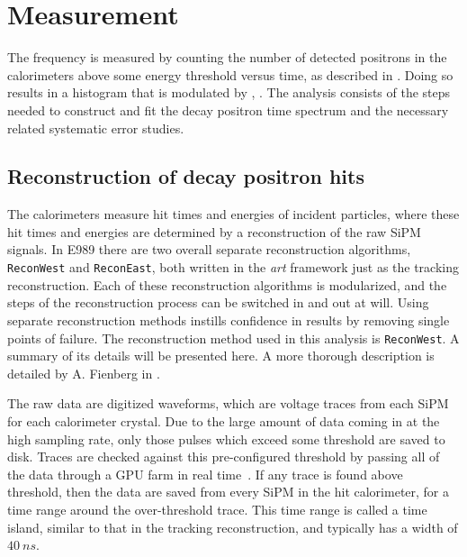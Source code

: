 
\thispagestyle{myheadings}

\graphicspath{{Body/Figures/Wa/Reconstruction/}{Body/Figures/Wa/Histogramming/}{Body/Figures/Wa/Pileup/}{Body/Figures/Wa/Pileup/TimeAndEnergySpectra/}{Body/Figures/Wa/Pileup/Scaling/}{Body/Figures/Wa/RatioAnalysis/}{Body/Figures/Wa/RatioAnalysis/MethodOverview/}{Body/Figures/Wa/RatioAnalysis/VW_Studies/}{Body/Figures/Wa/Datasets/Endgame/LostMuonFiles/MainCuts/}{Body/Figures/Wa/Datasets/ComparisonPlots/LostMuons/}{Body/Figures/Wa/Datasets/60h/SingleIteration/SingleFits/}{Body/Figures/Wa/Datasets/9d/EnergyThreshold/}{Body/Figures/Wa/Datasets/60h/NoTimeRand/}}

\chapter{\texorpdfstring{\wa}{wa} Measurement}
\label{chapter:wa}


The \gmtwo frequency \wa is measured by counting the number of detected positrons in the calorimeters above some energy threshold versus time, as described in . Doing so results in a histogram that is modulated by \wa, . The \wa analysis consists of the steps needed to construct and fit the decay positron time spectrum and the necessary related systematic error studies.


\section{Reconstruction of decay positron hits}
\label{sec:ReconWest}


The calorimeters measure hit times and energies of incident particles, where these hit times and energies are determined by a reconstruction of the raw SiPM signals. In E989 there are two overall separate reconstruction algorithms, \texttt{ReconWest} and \texttt{ReconEast}, both written in the \textit{art} framework just as the tracking reconstruction. Each of these reconstruction algorithms is modularized, and the steps of the reconstruction process can be switched in and out at will. Using separate reconstruction methods instills confidence in results by removing single points of failure. The reconstruction method used in this analysis is \texttt{ReconWest}. A summary of its details will be presented here. A more thorough description is detailed by A. Fienberg in .


The raw data are digitized waveforms, which are voltage traces from each SiPM for each calorimeter crystal. Due to the large amount of data coming in at the high sampling rate, only those pulses which exceed some threshold are saved to disk. Traces are checked against this pre-configured threshold by passing all of the data through a GPU farm in real time~\cite{Gohn:2016shi}. If any trace is found above threshold, then the data are saved from every SiPM in the hit calorimeter, for a time range around the over-threshold trace. This time range is called a time island, similar to that in the tracking reconstruction, and typically has a width of $\SI{40}{ns}$.


